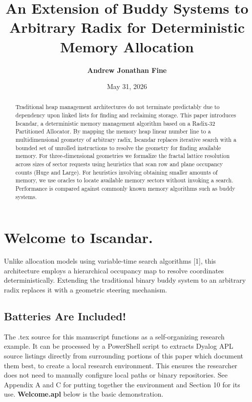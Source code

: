 \documentclass[11pt]{article}
\title{\textbf{An Extension of Buddy Systems to Arbitrary Radix
for Deterministic Memory Allocation}}
\author{\textbf{Andrew Jonathan Fine}}
\date{May 31, 2026}
\gdef\abstractcontent{
Traditional heap management architectures do not terminate predictably due to dependency upon linked lists for finding and reclaiming storage. This
paper introduces Iscandar, a deterministic memory management algorithm based on a Radix-32
Partitioned Allocator. By mapping the memory heap linear number line to a multidimensional
geometry of arbitrary radix, Iscandar replaces iterative search with a bounded set of unrolled instructions to resolve the geometry for finding available memory. For three-dimensional geometries
we formalize the fractal lattice resolution across sizes of sector requests using heuristics that scan row and plane occupancy counts (Huge and Large). For heuristics involving obtaining smaller amounts of memory, we use oracles to locate available memory sectors without invoking a search. Performance is compared against commonly known memory algorithms such as buddy systems.
}
\begin{document}
\maketitle

\begin{abstract}
\abstractcontent
\end{abstract}

\clearpage



\maketitle
\thispagestyle{empty} %
\newpage

\cleardoublepage
\tableofcontents
\newpage

\cleardoublepage
{}
{} %
\listofiscandar                                  %
\newpage

\pagestyle{plain}      %

\section{Welcome to \textbf{Iscandar}.}

Unlike allocation models using variable-time search algorithms [1], this architecture employs a hierarchical occupancy map to resolve coordinates deterministically. Extending the traditional binary buddy system to an arbitrary radix replaces it with a geometric steering mechanism.

\subsection{Batteries Are Included!}
The .tex source for this manuscript functions as a self-organizing research example. It can be processed by a PowerShell script to extracts Dyalog APL source listings directly from surrounding portions of this paper which document them best, to create a local research environment. This ensures the researcher does not need to manually configure local paths or binary repositories. See Appendix A and C for putting together the environment and Section 10 for its use. \textbf {Welcome.apl} below is the basic demonstration. 
\end{document}
